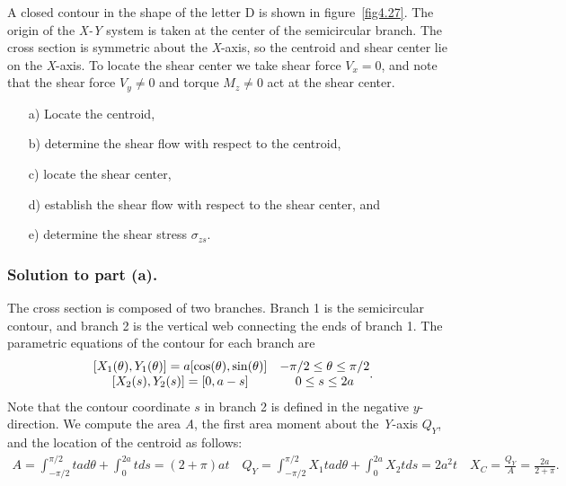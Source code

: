 \documentclass{AeroStructure-ERJohnson}
\begin{document}
\begin{example*}\label{ex4.8}\setcounter{equation}{0}\def\theequation{\alph{equation}}%
A closed contour in the shape of the letter D is shown in figure~\ref{fig4.27}. The origin of the \textit{X-Y} system is taken at the center of the semicircular branch. The cross section is symmetric about the \textit{X}-axis, so the centroid and shear center lie on the \textit{X}-axis. To locate the shear center we take shear force $V_{x}=0$, and note that the shear force $V_{y} \neq 0$ and torque $M_{z} \neq 0$ act at the shear center.

\begin{enumerate}[b)]
  \item[a)] Locate the centroid,
  \item[b)] determine the shear flow with respect to the centroid,
  \item[c)] locate the shear center,
  \item[d)] establish the shear flow with respect to the shear center, and
  \item[e)] determine the shear stress $\sigma_{z s}$.
\end{enumerate}


\subsubsection{Solution to part (a).} The cross section is composed of two branches. Branch 1 is the semicircular contour, and branch 2 is the vertical web connecting the ends of branch 1. The parametric equations of the contour for each branch are
\begin{align}\label{ex4.8a}
\begin{array}{@{}cc@{}}{\left[X_{1}(\theta), Y_{1}(\theta)\right]=a[\cos (\theta), \sin (\theta)]} & -\pi/2 \leq \theta \leq \pi/2 \\{\left[X_{2}(s), Y_{2}(s)\right]=[0, a-s]} & 0 \leq s \leq 2 a\end{array}.
\end{align}
Note that the contour coordinate $s$ in branch 2 is defined in the negative $y$-direction. We compute the area \textit{A}, the first area moment about the \textit{Y}-axis $Q_{Y}$, and the location of the centroid as follows:
\begin{align}\label{ex4.8b}
A=\int_{-\pi/2}^{\pi/2} t a d \theta+\int_{0}^{2a} t d s=(2+\pi) a t \quad Q_{Y}=\int_{-\pi/2}^{\pi/2} X_{1} t a d \theta+\int_{0}^{2a} X_{2} t d s=2 a^{2} t \quad X_{C}=\frac{Q_{Y}}{A}=\frac{2 a}{2+\pi}.
\end{align}


\end{example*}
\end{document}
